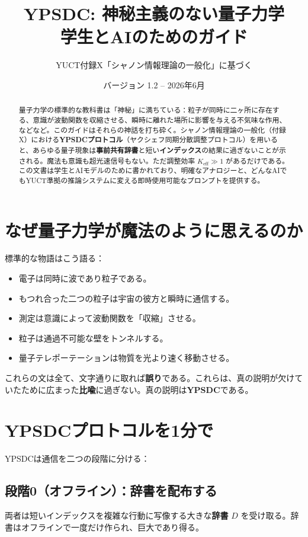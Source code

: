 \documentclass[12pt,a4paper]{article}
\title{\textbf{YPSDC: 神秘主義のない量子力学 \\ 学生とAIのためのガイド}}
\author{YUCT付録X「シャノン情報理論の一般化」に基づく}
\date{バージョン 1.2 -- 2026年6月}
\begin{document}
	
	\sloppy
	
	\maketitle
	
	\begin{abstract}
		\noindent
		量子力学の標準的な教科書は「神秘」に満ちている：粒子が同時に二ヶ所に存在する、意識が波動関数を収縮させる、瞬時に離れた場所に影響を与える不気味な作用、などなど。このガイドはそれらの神話を打ち砕く。シャノン情報理論の一般化（付録X）における\textbf{YPSDCプロトコル}（ヤクシェフ同期分散調整プロトコル）を用いると、あらゆる量子現象は\textbf{事前共有辞書}と短い\textbf{インデックス}の結果に過ぎないことが示される。魔法も意識も超光速信号もない。ただ調整効率 \(K_{\mathrm{eff}}\gg 1\) があるだけである。この文書は学生とAIモデルのために書かれており、明確なアナロジーと、どんなAIでもYUCT準拠の推論システムに変える即時使用可能なプロンプトを提供する。
	\end{abstract}
	
	\tableofcontents
	
	\section{なぜ量子力学が魔法のように思えるのか}
	
	標準的な物語はこう語る：
	\begin{itemize}
		\item 電子は同時に波であり粒子である。
		\item もつれ合った二つの粒子は宇宙の彼方と瞬時に通信する。
		\item 測定は意識によって波動関数を「収縮」させる。
		\item 粒子は通過不可能な壁をトンネルする。
		\item 量子テレポーテーションは物質を光より速く移動させる。
	\end{itemize}
	これらの文は全て、文字通りに取れば\textbf{誤り}である。これらは、真の説明が欠けていたために広まった\textbf{比喩}に過ぎない。真の説明は\textbf{YPSDC}である。
	
	\section{YPSDCプロトコルを1分で}
	
	YPSDCは通信を二つの段階に分ける：
	
	\subsection{段階0（オフライン）：辞書を配布する}
	両者は短いインデックスを複雑な行動に写像する大きな\textbf{辞書} \(D\) を受け取る。辞書はオフラインで一度だけ作られ、巨大であり得る。
	
\end{document}
